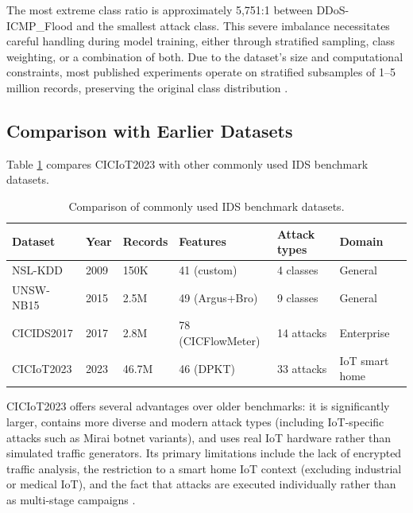 \par The most extreme class ratio is approximately 5,751:1 between DDoS-ICMP\_Flood and the smallest attack class. This severe imbalance necessitates careful handling during model training, either through stratified sampling, class weighting, or a combination of both. Due to the dataset's size and computational constraints, most published experiments operate on stratified subsamples of 1--5 million records, preserving the original class distribution \cite{CICIoT2023}.

\subsection{Comparison with Earlier Datasets}
\label{subsec:dataset_comparison}

\par Table \ref{tab:dataset_comparison} compares CICIoT2023 with other commonly used IDS benchmark datasets.

\begin{table}[htbp]
\begin{center}
\begin{tabular}{|p{70pt}|p{28pt}|p{42pt}|p{55pt}|p{38pt}|p{55pt}|}
\hline
\textbf{Dataset} & \textbf{Year} & \textbf{Records} & \textbf{Features} & \textbf{Attack types} & \textbf{Domain} \\
\hline
\hline NSL-KDD & 2009 & 150K & 41 (custom) & 4 classes & General \\
\hline UNSW-NB15 & 2015 & 2.5M & 49 (Argus+Bro) & 9 classes & General \\
\hline CICIDS2017 & 2017 & 2.8M & 78 (CICFlowMeter) & 14 attacks & Enterprise \\
\hline CICIoT2023 & 2023 & 46.7M & 46 (DPKT) & 33 attacks & IoT smart home \\
\hline
\end{tabular}
\end{center}
\caption{Comparison of commonly used IDS benchmark datasets.}
\label{tab:dataset_comparison}
\end{table}

\par CICIoT2023 offers several advantages over older benchmarks: it is significantly larger, contains more diverse and modern attack types (including IoT-specific attacks such as Mirai botnet variants), and uses real IoT hardware rather than simulated traffic generators. Its primary limitations include the lack of encrypted traffic analysis, the restriction to a smart home IoT context (excluding industrial or medical IoT), and the fact that attacks are executed individually rather than as multi-stage campaigns \cite{CICIoT2023}.

